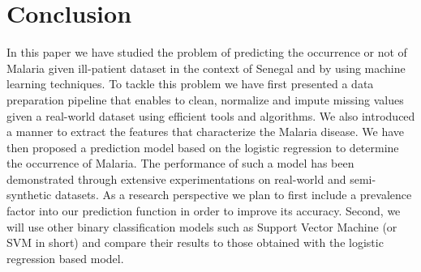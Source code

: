 \section{Conclusion}\label{conclusion}
In this paper we have studied the problem of predicting the occurrence or not of Malaria given ill-patient dataset in the context of Senegal and by using machine learning techniques.
To tackle this problem we have first presented a data preparation pipeline that enables to clean, normalize and impute missing values
given a real-world dataset using efficient tools and algorithms. We also introduced a manner to extract the features that characterize the Malaria disease.
We have then proposed a prediction model based on the logistic regression to determine the occurrence of Malaria. The performance of such a model has been
demonstrated through extensive experimentations on real-world and semi-synthetic datasets. As a research perspective we plan to first include a prevalence 
factor into our prediction function in order to improve its accuracy. Second, we will use other binary classification models such as Support Vector Machine
(or SVM in short) and compare their results to those obtained with the logistic regression based model.
